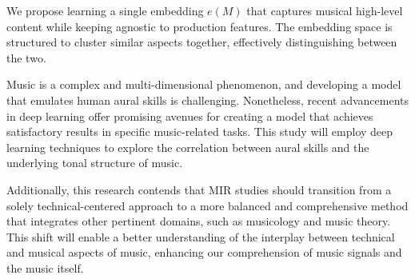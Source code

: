 We propose learning a single embedding $e(M)$ that captures musical high-level content while keeping agnostic to production features. The embedding space is structured to cluster similar aspects together, effectively distinguishing between the two.

Music is a complex and multi-dimensional phenomenon, and developing a model that emulates human aural skills is challenging. Nonetheless, recent advancements in deep learning offer promising avenues for creating a model that achieves satisfactory results in specific music-related tasks. This study will employ deep learning techniques to explore the correlation between aural skills and the underlying tonal structure of music.

Additionally, this research contends that MIR studies should transition from a solely technical-centered approach to a more balanced and comprehensive method that integrates other pertinent domains, such as musicology and music theory. This shift will enable a better understanding of the interplay between technical and musical aspects of music, enhancing our comprehension of music signals and the music itself.

